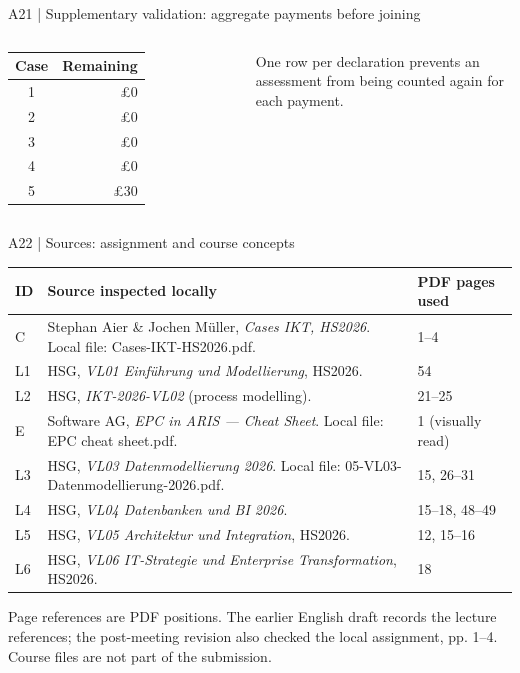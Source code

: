 \begin{frame}[fragile]{A21 | Supplementary validation: aggregate payments before joining}
\begin{columns}[T,onlytextwidth]

\small
\begin{tabular}{@{}cr@{}}\toprule
Case & Remaining\\\midrule
1 & £0\\2 & £0\\3 & £0\\4 & £0\\5 & £30\\\bottomrule
\end{tabular}
\par\medskip
One row per declaration prevents an assessment from being counted again for each payment.
\end{columns}
\end{frame}

\begin{frame}{A22 | Sources: assignment and course concepts}
\fontsize{8.4}{10.1}\selectfont
\begin{tabularx}{\textwidth}{@{}p{}X p{}@{}}\toprule
ID & \textbf{Source inspected locally} & \textbf{PDF pages used}\\\midrule
C & Stephan Aier \& Jochen Müller, \emph{Cases IKT, HS2026}. Local file: Cases-IKT-HS2026.pdf. & 1–4\\
L1 & HSG, \emph{VL01 Einführung und Modellierung}, HS2026. & 54\\
L2 & HSG, \emph{IKT-2026-VL02} (process modelling). & 21–25\\
E & Software AG, \emph{EPC in ARIS — Cheat Sheet}. Local file: EPC cheat sheet.pdf. & 1 (visually read)\\
L3 & HSG, \emph{VL03 Datenmodellierung 2026}. Local file: 05-VL03-Datenmodellierung-2026.pdf. & 15, 26–31\\
L4 & HSG, \emph{VL04 Datenbanken und BI 2026}. & 15–18, 48–49\\
L5 & HSG, \emph{VL05 Architektur und Integration}, HS2026. & 12, 15–16\\
L6 & HSG, \emph{VL06 IT-Strategie und Enterprise Transformation}, HS2026. & 18\\\bottomrule
\end{tabularx}\par
\medskip
Page references are PDF positions. The earlier English draft records the lecture references; the post-meeting revision also checked the local assignment, pp. 1–4. Course files are not part of the submission.
\end{frame}


